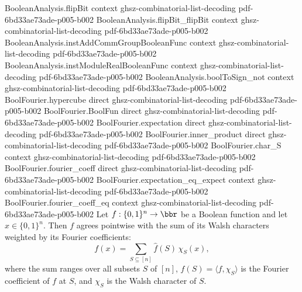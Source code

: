 \begin{lemma}
\proofstep
  {BooleanAnalysis.flipBit}
  {context}
  {ghsz-combinatorial-list-decoding}
  {pdf-6bd33ae73ade-p005-b002}
\proofstep
  {BooleanAnalysis.flipBit_flipBit}
  {context}
  {ghsz-combinatorial-list-decoding}
  {pdf-6bd33ae73ade-p005-b002}
\proofstep
  {BooleanAnalysis.instAddCommGroupBooleanFunc}
  {context}
  {ghsz-combinatorial-list-decoding}
  {pdf-6bd33ae73ade-p005-b002}
\proofstep
  {BooleanAnalysis.instModuleRealBooleanFunc}
  {context}
  {ghsz-combinatorial-list-decoding}
  {pdf-6bd33ae73ade-p005-b002}
\proofstep
  {BooleanAnalysis.boolToSign_not}
  {context}
  {ghsz-combinatorial-list-decoding}
  {pdf-6bd33ae73ade-p005-b002}
\proofstep
  {BoolFourier.hypercube}
  {direct}
  {ghsz-combinatorial-list-decoding}
  {pdf-6bd33ae73ade-p005-b002}
\proofstep
  {BoolFourier.BoolFun}
  {direct}
  {ghsz-combinatorial-list-decoding}
  {pdf-6bd33ae73ade-p005-b002}
\proofstep
  {BoolFourier.expectation}
  {direct}
  {ghsz-combinatorial-list-decoding}
  {pdf-6bd33ae73ade-p005-b002}
\proofstep
  {BoolFourier.inner_product}
  {direct}
  {ghsz-combinatorial-list-decoding}
  {pdf-6bd33ae73ade-p005-b002}
\proofstep
  {BoolFourier.char_S}
  {context}
  {ghsz-combinatorial-list-decoding}
  {pdf-6bd33ae73ade-p005-b002}
\proofstep
  {BoolFourier.fourier_coeff}
  {direct}
  {ghsz-combinatorial-list-decoding}
  {pdf-6bd33ae73ade-p005-b002}
\proofstep
  {BoolFourier.expectation_eq_expect}
  {context}
  {ghsz-combinatorial-list-decoding}
  {pdf-6bd33ae73ade-p005-b002}
\proofstep
  {BoolFourier.fourier_coeff_eq}
  {context}
  {ghsz-combinatorial-list-decoding}
  {pdf-6bd33ae73ade-p005-b002}
Let $f : \{0,1\}^n \to \bbr$ be a Boolean function and let $x \in \{0,1\}^n$. Then $f$
agrees pointwise with the sum of its Walsh characters weighted by its Fourier
coefficients:
\[
  f(x) = \sum_{S \subseteq [n]} \hat f(S)\,\chi_S(x),
\]
where the sum ranges over all subsets $S$ of $[n]$, $\hat f(S) = \langle f,
\chi_S\rangle$ is the Fourier coefficient of $f$ at $S$, and $\chi_S$ is the Walsh
character of $S$.
\end{lemma}

